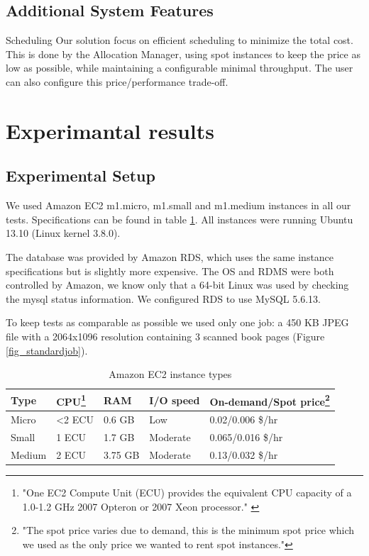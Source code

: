 \documentclass[a4paper]{IEEEtran}
\begin{document}
\subsection*{Additional System Features}

\begin{LaTeXdescription}
\item[Scheduling]
Our solution focus on efficient scheduling to minimize the total cost. This is done by the Allocation Manager, using spot instances to keep the price as low as possible, while maintaining a configurable minimal throughput.
The user can also configure this price/performance trade-off.

\end{LaTeXdescription}

\section{Experimantal results}

\subsection{Experimental Setup}

We used Amazon EC2 m1.micro, m1.small and m1.medium instances in all our tests. Specifications can be found in table \ref{amazoninstancespec}. All instances were running Ubuntu 13.10 (Linux kernel 3.8.0).

The database was provided by Amazon RDS, which uses the same instance specifications but is slightly more expensive. The OS and RDMS were both controlled by Amazon, we know only that a 64-bit Linux was used by checking the mysql status information. We configured RDS to use MySQL 5.6.13.

To keep tests as comparable as possible we used only one job: a 450 KB JPEG file with a 2064x1096 resolution containing 3 scanned book pages (Figure \ref{fig_standardjob}).

\begin{savenotes}
\begin{table}
\centering

\begin{tabular}{| l | l | l | l | l |}
\hline
Type & CPU\footnote{"One EC2 Compute Unit (ECU) provides the equivalent CPU capacity of a 1.0-1.2 GHz 2007 Opteron or 2007 Xeon processor." \cite{amazonecu}} & RAM & I/O speed & On-demand/Spot price\footnote{"The spot price varies due to demand, this is the minimum spot price which we used as the only price we wanted to rent spot instances."} \\ \hline
Micro & \textless 2 ECU & 0.6 GB & Low & 0.02/0.006 \$/hr \\ \hline
Small & 1 ECU & 1.7 GB & Moderate & 0.065/0.016 \$/hr \\ \hline
Medium & 2 ECU & 3.75 GB & Moderate & 0.13/0.032 \$/hr \\ \hline
\end{tabular}

\caption{Amazon EC2 instance types}
\label{amazoninstancespec}
\end{table}
\end{savenotes}
\end{document}
